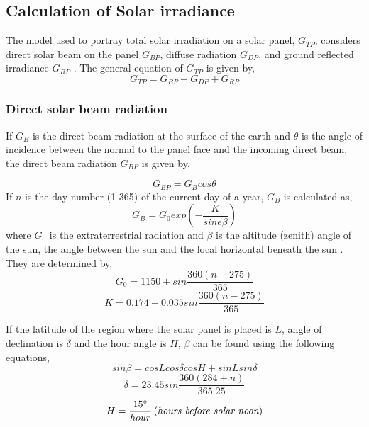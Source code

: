 \documentclass[journal]{IEEEtran/IEEEtran}
\begin{document}
	\subsection{Calculation of Solar irradiance}
	The model used to portray total solar irradiation on a solar panel, $G_{TP}$, considers direct solar beam on the panel $G_{BP}$, diffuse radiation $G_{DP}$, and ground reflected irradiance $G_{RP}$ \cite{deodusabe}. The general equation of $G_{TP}$ is given by,
	\begin{equation}
	\label{eq:gt}
	G_{TP} = G_{BP} + G_{DP} + G_{RP}
	\end{equation}
	\subsubsection{Direct solar beam radiation}
	If $G_B$ is the direct beam radiation at the surface of the earth and $\theta$ is the angle of incidence between the normal to the panel face and the incoming direct beam, the direct beam radiation $G_{BP}$ is given by,
	
	\begin{equation}
	\label{gbp}
	G_{BP}= G_Bcos\theta
	\end{equation}
	If $n$ is the day number (1-365) of the current day of a year, $G_B$ is calculated as, 
	\begin{equation}
	\label{gb}
	G_{B}= G_0exp\left(-\frac{K}{sine\beta}\right)
	\end{equation}
	where $G_0$ is the extraterrestrial radiation and $\beta$ is the altitude (zenith) angle of the sun, the angle between the sun and the local horizontal beneath the sun \cite{deodusabe}. They are determined by,
	\begin{equation}
	\label{g0}
	G_{0}= 1150+sin\frac{360\left(n-275\right)}{365}
	\end{equation}
	\begin{equation}
	\label{k}
	K= 0.174+0.035sin\frac{360\left(n-275\right)}{365}
	\end{equation}
	
	If the latitude of the region where the solar panel is placed is $L$, angle of declination is $\delta$ and the hour angle is $H$, $\beta$ can be found using the following equations,
	\begin{equation}
	\label{sinbeta}
	sin\beta= cosL cos\delta cosH+sinLsin\delta
	\end{equation}
	\begin{equation}
	\label{delta}
	\delta= 23.45sin\frac{360\left(284+n\right)}{365.25}
	\end{equation}
	\begin{equation}
	\label{h}
	H= \frac{15\degree}{hour}\left(\textit{hours before solar noon}\right)
	\end{equation}
	
\end{document}
